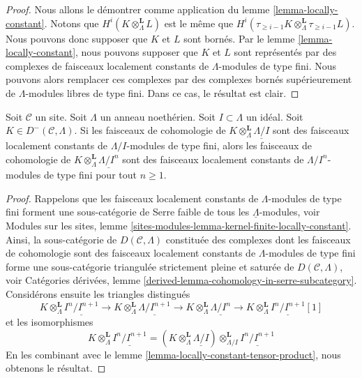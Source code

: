 \begin{proof}
Nous allons le démontrer comme application du lemme
\ref{lemma-locally-constant}. Notons que
$H^i(K \otimes_\Lambda^\mathbf{L} L)$ est le même que
$H^i(\tau_{\geq i - 1}K \otimes_\Lambda^\mathbf{L} \tau_{\geq i - 1}L)$.
Nous pouvons donc supposer que $K$ et $L$ sont bornés. Par le lemme
\ref{lemma-locally-constant}, nous pouvons supposer que $K$ et $L$ sont
représentés par des complexes de faisceaux localement constants de
$\Lambda$-modules de type fini. Nous pouvons alors remplacer ces complexes
par des complexes bornés supérieurement de $\Lambda$-modules libres de type
fini. Dans ce cas, le résultat est clair.
\end{proof}

\begin{lemma}
\label{lemma-locally-constant-bounded}
Soit $\mathcal{C}$ un site. Soit $\Lambda$ un anneau noethérien. Soit
$I \subset \Lambda$ un idéal. Soit $K \in D^-(\mathcal{C}, \Lambda)$. Si les
faisceaux de cohomologie de
$K \otimes_\Lambda^\mathbf{L} \underline{\Lambda/I}$ sont des faisceaux
localement constants de $\Lambda/I$-modules de type fini, alors les faisceaux
de cohomologie de
$K \otimes_\Lambda^\mathbf{L} \underline{\Lambda/I^n}$ sont des faisceaux
localement constants de $\Lambda/I^n$-modules de type fini pour tout
$n \geq 1$.
\end{lemma}

\begin{proof}
Rappelons que les faisceaux localement constants de $\Lambda$-modules de type
fini forment une sous-catégorie de Serre faible de tous les
$\underline{\Lambda}$-modules, voir Modules sur les sites, lemme
\ref{sites-modules-lemma-kernel-finite-locally-constant}. Ainsi, la
sous-catégorie de $D(\mathcal{C}, \Lambda)$ constituée des complexes dont les
faisceaux de cohomologie sont des faisceaux localement constants de
$\Lambda$-modules de type fini forme une sous-catégorie triangulée strictement
pleine et saturée de $D(\mathcal{C}, \Lambda)$, voir Catégories dérivées,
lemme \ref{derived-lemma-cohomology-in-serre-subcategory}. Considérons ensuite
les triangles distingués
$$
K \otimes_\Lambda^\mathbf{L} \underline{I^n/I^{n + 1}} \to
K \otimes_\Lambda^\mathbf{L} \underline{\Lambda/I^{n + 1}} \to
K \otimes_\Lambda^\mathbf{L} \underline{\Lambda/I^n} \to
K \otimes_\Lambda^\mathbf{L} \underline{I^n/I^{n + 1}}[1]
$$
et les isomorphismes
$$
K \otimes_\Lambda^\mathbf{L} \underline{I^n/I^{n + 1}}
=
\left(K \otimes_\Lambda^\mathbf{L} \underline{\Lambda/I}\right)
\otimes_{\Lambda/I}^\mathbf{L} \underline{I^n/I^{n + 1}}
$$
En les combinant avec le lemme \ref{lemma-locally-constant-tensor-product},
nous obtenons le résultat.
\end{proof}













